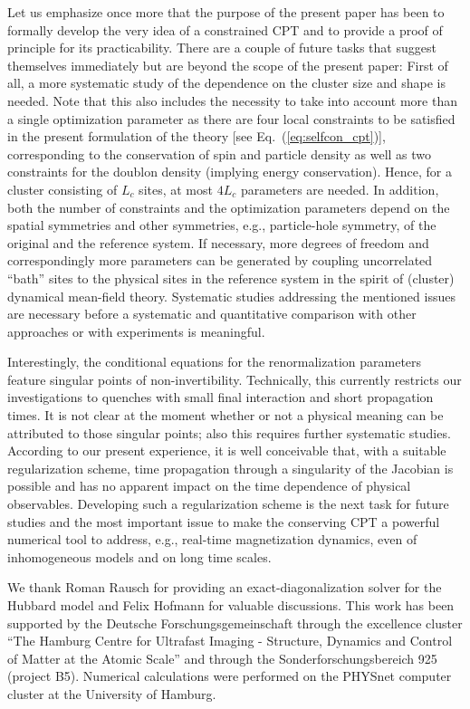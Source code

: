 \documentclass[twocolumn,prb,showpacs,aps,superscriptaddress]{revtex4}
\begin{document}
Let us emphasize once more that the purpose of the present paper has been to formally develop the very idea of a constrained CPT and to provide a proof of principle for its practicability. 
There are a couple of future tasks that suggest themselves immediately but are beyond the scope of the present paper:
First of all, a more systematic study of the dependence on the cluster size and shape is needed. 
Note that this also includes the necessity to take into account more than a single optimization parameter as there are four local constraints to be satisfied in the present formulation of the theory [see Eq.\ (\ref{eq:selfcon_cpt})], corresponding to the conservation of spin and particle density as well as two constraints for the doublon density (implying energy conservation).
Hence, for a cluster consisting of $L_{c}$ sites, at most $4L_{c}$ parameters are needed. 
In addition, both the number of constraints and the optimization parameters depend on the spatial symmetries and other symmetries, e.g., particle-hole symmetry, of the original and the reference system.
If necessary, more degrees of freedom and correspondingly more parameters can be generated by coupling uncorrelated ``bath'' sites to the physical sites in the reference system in the spirit of (cluster) dynamical mean-field theory. 
Systematic studies addressing the mentioned issues are necessary before a systematic and quantitative comparison with other approaches or with experiments is meaningful.

Interestingly, the conditional equations for the renormalization parameters feature singular points of non-invertibility.  Technically, this currently restricts our investigations to quenches with small final interaction and short propagation times.  
It is not clear at the moment whether or not a physical meaning can be attributed to those singular points; also this requires further systematic studies.  
According to our present experience, it is well conceivable that, with a suitable regularization scheme, time propagation
through a singularity of the Jacobian is possible and has no apparent impact on the time dependence of physical observables.  
Developing such a regularization scheme is the next task for future studies and the most important issue to make the
conserving CPT a powerful numerical tool to address, e.g., real-time magnetization dynamics, even of inhomogeneous models and on long time scales.

\begin{acknowledgments}
We thank Roman Rausch for providing an exact-diagonalization solver for the
Hubbard model and Felix Hofmann for valuable discussions.  This work has been
supported by the Deutsche Forschungsgemeinschaft through the excellence cluster
``The Hamburg Centre for Ultrafast Imaging - Structure, Dynamics and Control of
Matter at the Atomic Scale'' and through the Sonderforschungsbereich 925
(project B5).  Numerical calculations were performed on the PHYSnet computer
cluster at the University of Hamburg.
\end{acknowledgments}
\end{document}

